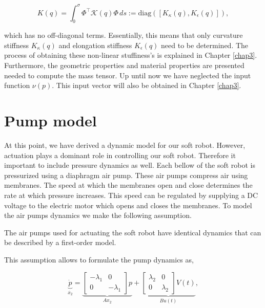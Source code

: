 \begin{equation}
    K(q) = \int_0^\sigma \Phi^\top \mathcal{K}(q) \Phi \hspace{2pt} ds := \text{diag}([K_\kappa(q), K_\epsilon(q)]),
\end{equation}

which has no off-diagonal terms. Essentially, this means that only curvature stiffness $K_\kappa(q)$ and elongation stiffness $K_\epsilon(q)$ need to be determined. The process of obtaining these non-linear stuffiness's is explained in Chapter \ref{chap3}. Furthermore, the geometric properties and material properties are presented needed to compute the mass tensor. Up until now we have neglected the input function $\nu(p)$. This input vector will also be obtained in Chapter \ref{chap3}. 




\section{Pump model}

At this point, we have derived a dynamic model for our soft robot. However, actuation plays a dominant role in controlling our soft robot. Therefore it important to include pressure dynamics as well. Each bellow of the soft robot is pressurized using a diaphragm air pump. These air pumps compress air using membranes. The speed at which the membranes open and close determines the rate at which pressure increases. This speed can be regulated by supplying a DC voltage to the electric motor which opens and closes the membranes. To model the air pumps dynamics we make the following assumption.

\begin{theorem}
The air pumps used for actuating the soft robot have identical dynamics that can be described by a first-order model.
\end{theorem}

This assumption allows to formulate the pump dynamics as,

\begin{equation}
 \underbrace{\dot{p}}_{\dot{x_2}}  = \underbrace{\begin{bmatrix} -\lambda_1 & 0 \\ 0 & -\lambda_1 \end{bmatrix} p}_{Ax_2} + \underbrace{\begin{bmatrix} \lambda_2 & 0 \\ 0 & \lambda_2 \end{bmatrix} V(t)}_{Bu(t)},
    \label{eq2:pumpmodel}
\end{equation}

